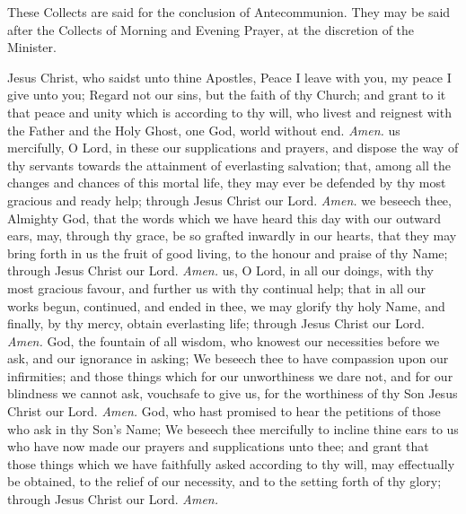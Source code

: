 \label{AdditionalCollects}
\begin{rubric}
    These Collects are said for the conclusion of Antecommunion. They may be said after the Collects of Morning and Evening Prayer, at the discretion of the Minister.
\end{rubric}
 Jesus Christ, who saidst unto thine Apostles, Peace I leave with you, my peace I give unto you; Regard not our sins, but the faith of thy Church; and grant to it that peace and unity which is according to thy will, who livest and reignest with the Father and the Holy Ghost, one God, world without end. \textit{Amen.}
 us mercifully, O Lord, in these our supplications and prayers, and dispose the way of thy servants towards the attainment of everlasting salvation; that, among all the changes and chances of this mortal life, they may ever be defended by thy most gracious and ready help; through Jesus Christ our Lord. \textit{Amen.}
 we beseech thee, Almighty God, that the words which we have heard this day with our outward ears, may, through thy grace, be so grafted inwardly in our hearts, that they may bring forth in us the fruit of good living, to the honour and praise of thy Name; through Jesus Christ our Lord. \textit{Amen.}
 us, O Lord, in all our doings, with thy most gracious favour, and further us with thy continual help; that in all our works begun, continued, and ended in thee, we may glorify thy holy Name, and finally, by thy mercy, obtain everlasting life; through Jesus Christ our Lord. \textit{Amen.}
 God, the fountain of all wisdom, who knowest our necessities before we ask, and our ignorance in asking; We beseech thee to have compassion upon our infirmities; and those things which for our unworthiness we dare not, and for our blindness we cannot ask, vouchsafe to give us, for the worthiness of thy Son Jesus Christ our Lord. \textit{Amen.}
 God, who hast promised to hear the petitions of those who ask in thy Son's Name; We beseech thee mercifully to incline thine ears to us who have now made our prayers and supplications unto thee; and grant that those things which we have faithfully asked according to thy will, may effectually be obtained, to the relief of our necessity, and to the setting forth of thy glory; through Jesus Christ our Lord. \textit{Amen.}

